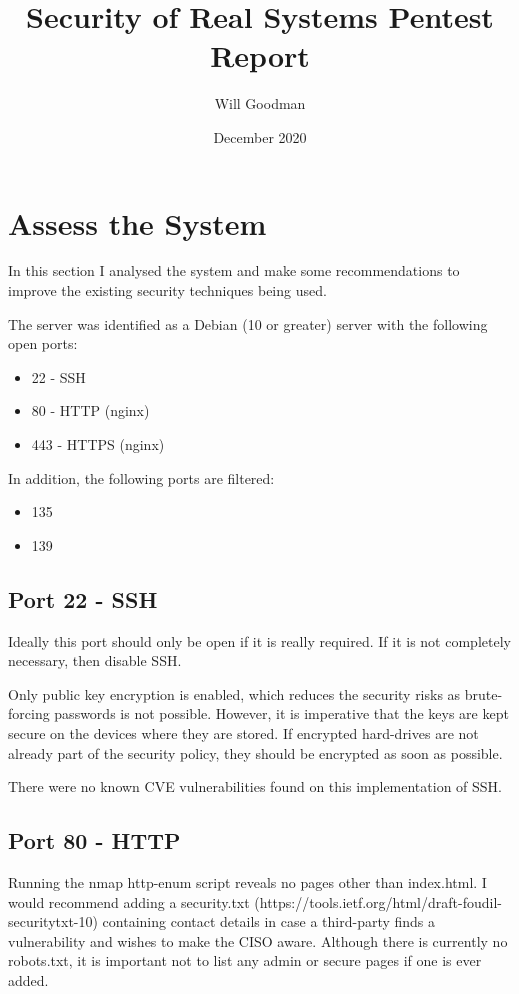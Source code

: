 \documentclass[12pt]{article}
\title{Security of Real Systems Pentest Report}
\date{December 2020}
\author{Will Goodman}
\begin{document}
  \maketitle

  \section{Assess the System}
  In this section I analysed the system and make some recommendations to improve the existing security techniques being used.

  The server was identified as a Debian (10 or greater) server with the following open ports:
  \begin{itemize}
    \item 22 - SSH
    \item 80 - HTTP (nginx)
    \item 443 - HTTPS (nginx)
  \end{itemize}
  In addition, the following ports are filtered:
  \begin{itemize}
    \item 135
    \item 139
  \end{itemize}

  \subsection{Port 22 - SSH}
  Ideally this port should only be open if it is really required.
  If it is not completely necessary, then disable SSH.

  Only public key encryption is enabled, which reduces the security risks as brute-forcing passwords is not possible.
  However, it is imperative that the keys are kept secure on the devices where they are stored.
  If encrypted hard-drives are not already part of the security policy, they should be encrypted as soon as possible.

  There were no known CVE vulnerabilities found on this implementation of SSH.

  \subsection{Port 80 - HTTP}
  Running the nmap http-enum script reveals no pages other than index.html.
  I would recommend adding a security.txt (https://tools.ietf.org/html/draft-foudil-securitytxt-10) containing contact details in case a third-party finds a vulnerability and wishes to make the CISO aware.
  Although there is currently no robots.txt, it is important not to list any admin or secure pages if one is ever added.
\end{document}
